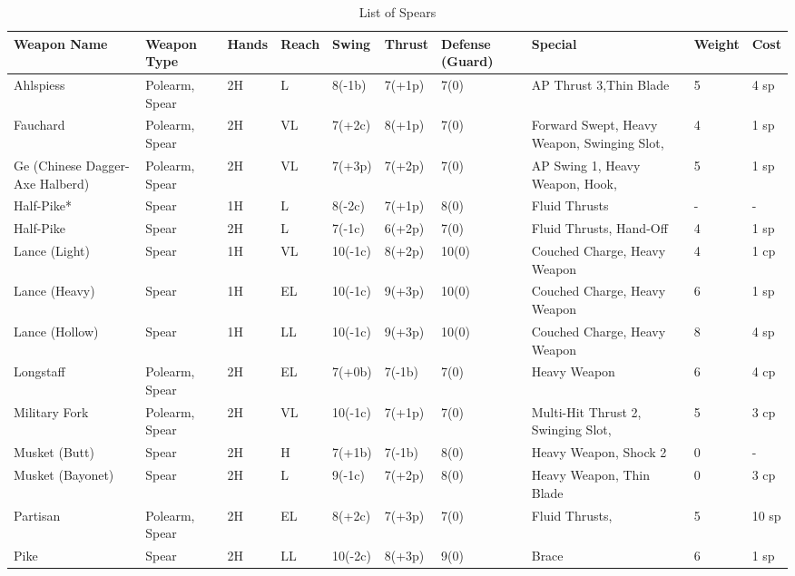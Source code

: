 \documentclass[oneside,11pt,english]{book}
\begin{document}
\begin{longtabu} to 1\linewidth {X[2,l] X X[-1,c] X[-1,c] XX X[-1,c] X[2,l] X[-3,c] X[-3,r]}
	\caption{List of Spears}
	\label{tab:Spears}\\
Weapon Name						&Weapon Type			&Hands	&Reach	&Swing		&Thrust	&Defense (Guard)	&Special																	&Weight	&Cost\\\toprule\endhead
Ahlspiess 						&Polearm, Spear			&2H		&L		&8(-1b)		&7(+1p) &7(0)				&AP Thrust 3,Thin Blade 													&5		&4 sp\\
Fauchard 						&Polearm, Spear			&2H		&VL 	&7(+2c)		&8(+1p) &7(0)				&Forward Swept, Heavy Weapon, Swinging Slot,								&4		&1 sp\\
Ge (Chinese Dagger-Axe Halberd)	&Polearm, Spear			&2H		&VL 	&7(+3p)		&7(+2p) &7(0)				&AP Swing 1, Heavy Weapon, Hook,											&5		&1 sp\\
Half-Pike* 						&Spear					&1H		&L		&8(-2c)		&7(+1p) &8(0)				&Fluid Thrusts																&-		&-\\
Half-Pike 						&Spear 					&2H		&L		&7(-1c)		&6(+2p) &7(0)				&Fluid Thrusts, Hand-Off 													&4		&1 sp\\
Lance (Light) 					&Spear 					&1H		&VL		&10(-1c)	&8(+2p) &10(0)				&Couched Charge, Heavy Weapon 												&4		&1 cp\\
Lance (Heavy) 					&Spear 					&1H		&EL		&10(-1c)	&9(+3p) &10(0)				&Couched Charge, Heavy Weapon 												&6		&1 sp\\
Lance (Hollow) 					&Spear 					&1H		&LL		&10(-1c)	&9(+3p) &10(0)				&Couched Charge, Heavy Weapon 												&8		&4 sp\\
Longstaff 						&Polearm, Spear			&2H		&EL		&7(+0b)		&7(-1b) &7(0)				&Heavy Weapon																&6		&4 cp\\
Military Fork 					&Polearm, Spear			&2H		&VL		&10(-1c)	&7(+1p) &7(0)				&Multi-Hit Thrust 2, Swinging Slot, 										&5		&3 cp\\
Musket (Butt) 					&Spear					&2H		&H		&7(+1b)		&7(-1b) &8(0)				&Heavy Weapon, Shock 2														&0		&-\\
Musket (Bayonet) 				&Spear					&2H		&L		&9(-1c)		&7(+2p) &8(0)				&Heavy Weapon, Thin Blade													&0		&3 cp\\
Partisan 						&Polearm, Spear			&2H		&EL		&8(+2c)		&7(+3p) &7(0)				&Fluid Thrusts,																&5		&10 sp\\
Pike 							&Spear 					&2H		&LL		&10(-2c)	&8(+3p) &9(0)				&Brace																		&6		&1 sp\\

\end{longtabu}
\end{document}
